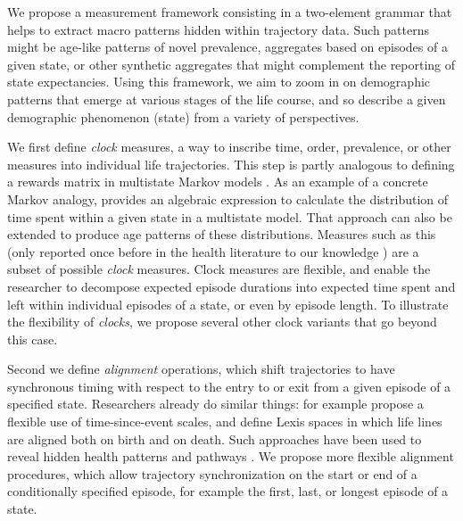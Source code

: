\documentclass[a4paper,left=1.25cm,right=1.25cm,top=1.25cm,bottom=1.25cm]{article}
\begin{document}
% 
% 
% 
% 
We propose a measurement framework consisting in a two-element grammar that helps to extract macro patterns hidden within trajectory data. Such patterns might be age-like patterns of novel prevalence, aggregates based on episodes of a given state, or other synthetic aggregates that might complement the reporting of state expectancies. Using this framework, we aim to zoom in on demographic patterns that emerge at various stages of the life course, and so describe a given demographic phenomenon (state) from a variety of perspectives. 

We first define \emph{clock} measures, a way to inscribe time, order, prevalence, or other measures into individual life trajectories. This step is partly analogous to defining a rewards matrix in multistate Markov models \citep[see e.g.][]{caswell2018matrix}. As an example of a concrete Markov analogy, \citet{dudel2018expanding} provides an algebraic expression to calculate the distribution of time spent within a given state in a multistate model. That approach can also be extended to produce age patterns of these distributions. Measures such as this (only reported once before in the health literature to our knowledge \citep{laditka1998new}) are a subset of possible \emph{clock} measures. Clock measures are flexible, and enable the researcher to decompose expected episode durations into expected time spent and left within individual episodes of a state, or even by episode length. To illustrate the flexibility of \emph{clocks}, we propose several other clock variants that go beyond this case.

Second we define \emph{alignment} operations, which shift trajectories to have synchronous timing with respect to the entry to or exit from a given episode of a specified state. Researchers already do similar things: for example \citet{iacobelli2013multiple} propose a flexible use of time-since-event scales, and \citet{riffe2017unified} define Lexis spaces in which life lines are aligned both on birth and on death. Such approaches have been used to reveal hidden health patterns \citep{riffe2016time} and pathways \citep{potente2018disability, raab2018pathways}. We propose more flexible alignment procedures, which allow trajectory synchronization on the start or end of a conditionally specified episode, for example the first, last, or longest episode of a state.
\end{document}
